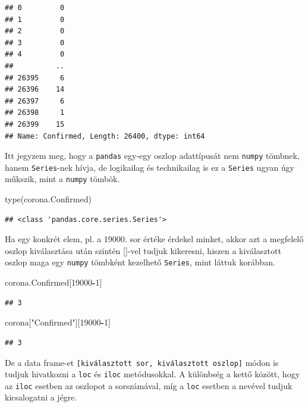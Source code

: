 \documentclass[
]{book}
\newenvironment{Shaded}{\begin{snugshade}}{\end{snugshade}}
\newcommand{\BuiltInTok}[1]{#1}
\newcommand{\DecValTok}[1]{\textcolor[rgb]{0.00,0.00,0.81}{#1}}
\newcommand{\NormalTok}[1]{#1}
\newcommand{\OperatorTok}[1]{\textcolor[rgb]{0.81,0.36,0.00}{\textbf{#1}}}
\newcommand{\StringTok}[1]{\textcolor[rgb]{0.31,0.60,0.02}{#1}}
\begin{document}
\begin{verbatim}
## 0         0
## 1         0
## 2         0
## 3         0
## 4         0
##          ..
## 26395     6
## 26396    14
## 26397     6
## 26398     1
## 26399    15
## Name: Confirmed, Length: 26400, dtype: int64
\end{verbatim}

Itt jegyzem meg, hogy a \texttt{pandas} egy-egy oszlop adattípusát nem \texttt{numpy} tömbnek, hanem \texttt{Series}-nek hívja, de logikailag és technikailag is ez a \texttt{Series} ugyan úgy műkszik, mint a \texttt{numpy} tömbök.

\begin{Shaded}
\begin{Highlighting}[]
\BuiltInTok{type}\NormalTok{(corona.Confirmed)}
\end{Highlighting}
\end{Shaded}

\begin{verbatim}
## <class 'pandas.core.series.Series'>
\end{verbatim}

Ha egy konkrét elem, pl. a 19000. sor értéke érdekel minket, akkor azt a megfelelő oszlop kiválasztása után szintén {[}{]}-vel tudjuk kikeresni, hiszen a kiválasztott oszlop maga egy \texttt{numpy} tömbként kezelhető \texttt{Series}, mint láttuk korábban.

\begin{Shaded}
\begin{Highlighting}[]
\NormalTok{corona.Confirmed[}\DecValTok{19000}\OperatorTok{{-}}\DecValTok{1}\NormalTok{]}
\end{Highlighting}
\end{Shaded}

\begin{verbatim}
## 3
\end{verbatim}

\begin{Shaded}
\begin{Highlighting}[]
\NormalTok{corona[}\StringTok{"Confirmed"}\NormalTok{][}\DecValTok{19000}\OperatorTok{{-}}\DecValTok{1}\NormalTok{]}
\end{Highlighting}
\end{Shaded}

\begin{verbatim}
## 3
\end{verbatim}

De a data frame-et \texttt{{[}kiválasztott\ sor,\ kiválasztott\ oszlop{]}} módon is tudjuk hivatkozni a \texttt{loc} és \texttt{iloc} metódusokkal. A különbség a kettő között, hogy az \texttt{iloc} esetben az oszlopot a sorszámával, míg a \texttt{loc} esetben a nevével tudjuk kicsalogatni a jégre.
\end{document}
